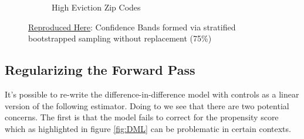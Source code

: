 \documentclass[a4paper,12pt]{article}
\begin{document}
\begin{figure}[htbp]
\begin{subfigure}{.48\textwidth}
    \caption{High Eviction Zip Codes}
\label{fig:diff_control_high}
\end{subfigure}
\caption{ \href{https://github.com/pharringtonp19/evictions/blob/main/scripts/cceh/primary/diff_n_mean_rrh.py}{Reproduced Here}: Confidence Bands formed via stratified bootstrapped sampling without replacement (75\%)}
\label{fig:diff_control}
\end{figure}


\subsection{Regularizing the Forward Pass}
It's possible to re-write the difference-in-difference model with controls as a linear version of the following estimator. Doing to we see that there are two potential concerns. The first is that the model fails to correct for the propensity score which as highlighted in figure \ref{fig:DML} can be problematic in certain contexts.  
\end{document}
